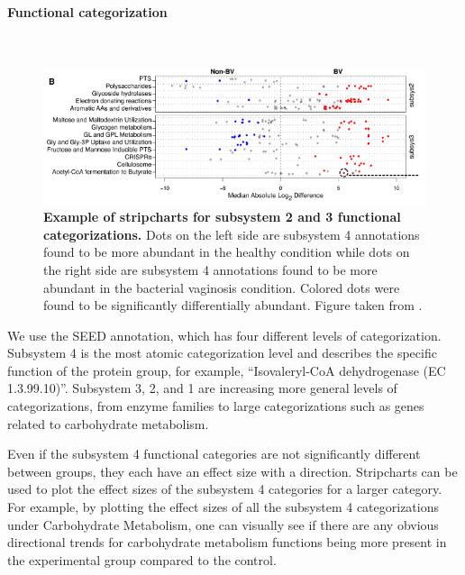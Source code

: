 \paragraph{Functional categorization}\mbox{}\\

\begin{figure}[h]
\begin{center}
\includegraphics[width=\textwidth]{stripchart.png}
\caption{\textbf{Example of stripcharts for subsystem 2 and 3 functional categorizations.} Dots on the left side are subsystem 4 annotations found to be more abundant in the healthy condition while dots on the right side are subsystem 4 annotations found to be more abundant in the bacterial vaginosis condition. Colored dots were found to be significantly differentially abundant. Figure taken from \cite{macklaim2013comparative}.}
\end{center}
\end{figure}

We use the SEED annotation, which has four different levels of categorization. Subsystem 4 is the most atomic categorization level and describes the specific function of the protein group, for example, “Isovaleryl-CoA dehydrogenase (EC 1.3.99.10)”. Subsystem 3, 2, and 1 are increasing more general levels of categorizations, from enzyme families to large categorizations such as genes related to carbohydrate metabolism.

Even if the subsystem 4 functional categories are not significantly different between groups, they each have an effect size with a direction. Stripcharts can be used to plot the effect sizes of the subsystem 4 categories for a larger category. For example, by plotting the effect sizes of all the subsystem 4 categorizations under Carbohydrate Metabolism, one can visually see if there are any obvious directional trends for carbohydrate metabolism functions being more present in the experimental group compared to the control.

\FloatBarrier

